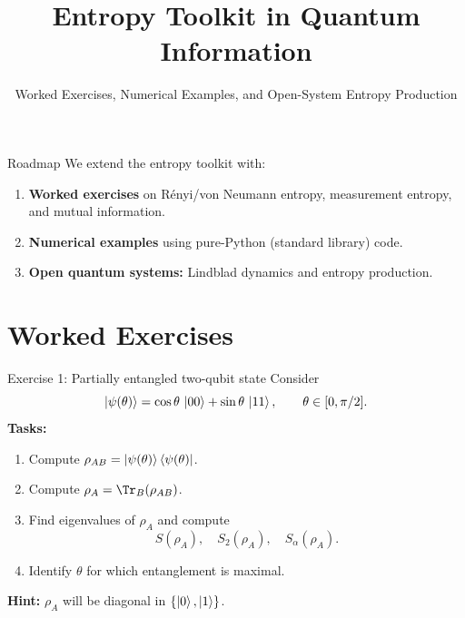 \documentclass[aspectratio=169]{beamer}
\title{Entropy Toolkit in Quantum Information}
\subtitle{Worked Exercises, Numerical Examples, and Open-System Entropy Production}
\author{}
\institute{}
\date{}
\begin{document}
\begin{frame}
  \titlepage
\end{frame}

\begin{frame}{Roadmap}
We extend the entropy toolkit with:
\begin{enumerate}
\item \textbf{Worked exercises} on Rényi/von Neumann entropy, measurement entropy, and mutual information.
\item \textbf{Numerical examples} using pure-Python (standard library) code.
\item \textbf{Open quantum systems:} Lindblad dynamics and entropy production.
\end{enumerate}
\end{frame}

\section{Worked Exercises}

\begin{frame}{Exercise 1: Partially entangled two-qubit state}
Consider
\[
\ket{\psi(\theta)}=\cos\theta\,\ket{00}+\sin\theta\,\ket{11},\qquad \theta\in[0,\pi/2].
\]
\textbf{Tasks:}
\begin{enumerate}
\item Compute $\rho_{AB}=\ket{\psi(\theta)}\bra{\psi(\theta)}$.
\item Compute $\rho_A=\Tr_B(\rho_{AB})$.
\item Find eigenvalues of $\rho_A$ and compute
\[
S(\rho_A),\quad S_2(\rho_A),\quad S_\alpha(\rho_A).
\]
\item Identify $\theta$ for which entanglement is maximal.
\end{enumerate}

\medskip
\textbf{Hint:} $\rho_A$ will be diagonal in $\{\ket{0},\ket{1}\}$.
\end{frame}
\end{document}
